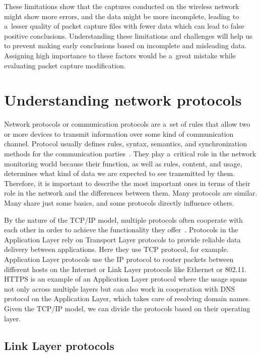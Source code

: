 \documentclass[
  printed,     %
  color,       %
  oneside,     %
  nosansbold,  %
  nocolorbold, %
  nolof,         %
  nolot,         %
]{fithesis4}
\begin{document}
These limitations show that the captures conducted on the wireless network might show more errors, and the data might be more incomplete, leading to a~lesser quality of packet capture files with fewer data which can lead to false positive conclusions. Understanding these limitations and challenges will help us to prevent making early conclusions based on incomplete and misleading data. Assigning high importance to these factors would be a~great mistake while evaluating packet capture modification.


\section{Understanding network protocols}
\label{chap:protocols}

Network protocols or communication protocols are a~set of rules that allow two or more devices to transmit information over some kind of communication channel. Protocol usually defines rules, syntax, semantics, and synchronization methods for the communication parties~\cite{Espacene23:online}. They play a~critical role in the network monitoring world because their function, as well as rules, content, and usage, determines what kind of data we are expected to see transmitted by them. Therefore, it is important to describe the most important ones in terms of their role in the network and the differences between them. Many protocols are similar. Many share just some basics, and some protocols directly influence others.

By the nature of the TCP/IP model, multiple protocols often cooperate with each other in order to achieve the functionality they offer~\cite{10.5555/2584507}. Protocols in the Application Layer rely on Transport Layer protocols to provide reliable data delivery between applications. Here they use TCP protocol, for example. Application Layer protocols use the IP protocol to router packets between different hosts on the Internet or Link Layer protocols like Ethernet or 802.11. HTTPS is an example of an Application Layer protocol where the usage spans not only across multiple layers but can also work in cooperation with DNS protocol on the Application Layer, which takes care of resolving domain names. Given the TCP/IP model, we can divide the protocols based on their operating layer.


\subsection{Link Layer protocols}
\end{document}
